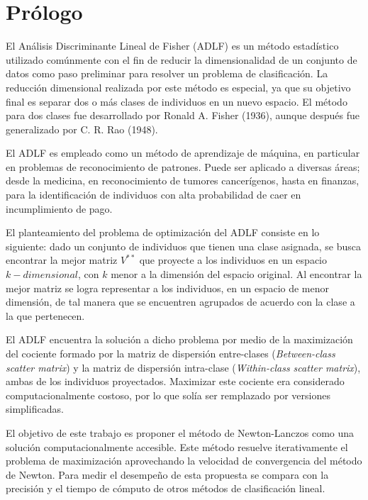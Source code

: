 \chapter*{Prólogo}	
\label{ch:prologo} 


El Análisis Discriminante Lineal de Fisher (ADLF) es un método estadístico utilizado comúnmente con el fin de reducir la dimensionalidad de un conjunto de datos como paso preliminar para resolver un problema de clasificación. La reducción dimensional realizada por este método es especial, ya que su objetivo final es separar dos o más clases de individuos en un nuevo espacio. El método para dos clases fue desarrollado por Ronald A. Fisher (1936), aunque después fue generalizado por C. R. Rao (1948).

El ADLF es empleado como un método de aprendizaje de máquina, en particular en problemas de reconocimiento de patrones. Puede ser aplicado a diversas áreas; desde la medicina, en reconocimiento de tumores cancerígenos, hasta en finanzas, 
para la identificación de individuos con alta probabilidad de caer en incumplimiento de pago.

El planteamiento del problema de optimización del ADLF consiste en lo siguiente: dado un conjunto de individuos que tienen una clase asignada, se busca encontrar la mejor matriz $V^{**}$ que proyecte a los individuos en un espacio $k-dimensional$, con $k$ menor a la dimensión del espacio original. Al encontrar la mejor matriz se logra representar a los individuos, en un espacio de menor dimensión, de tal manera que se encuentren agrupados de acuerdo con la clase a la que pertenecen.

El ADLF encuentra la solución a dicho problema por medio de la maximización del cociente formado por la matriz de dispersión entre-clases (\textit{Between-class scatter matrix}) y la matriz de dispersión intra-clase (\textit{Within-class scatter matrix}), ambas de los individuos proyectados. Maximizar este cociente era considerado computacionalmente costoso, por lo que solía ser remplazado por versiones simplificadas.

El objetivo de este trabajo es proponer el método de Newton-Lanczos como una solución computacionalmente accesible. Este método resuelve iterativamente el problema de maximización aprovechando la velocidad de convergencia del método de Newton. Para medir el desempeño de esta propuesta se compara con la precisión y el tiempo de cómputo de otros métodos de clasificación lineal. 

